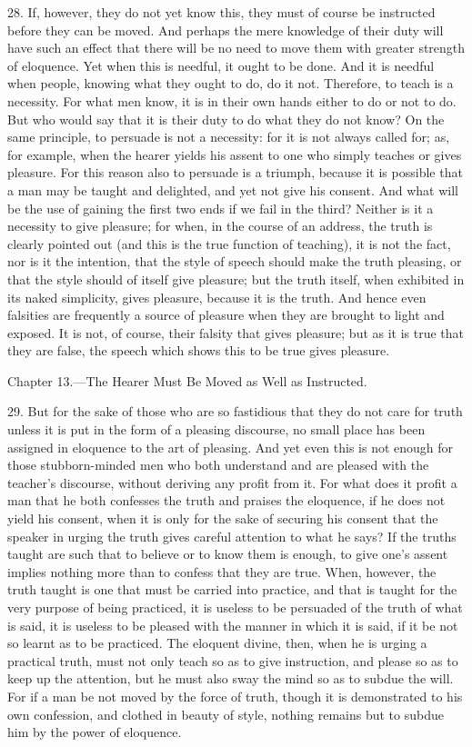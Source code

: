 28. If, however, they do not yet know this, they must of course be instructed before they can be moved. And perhaps the mere knowledge of their duty will have such an effect that there will be no need to move them with greater strength of eloquence. Yet when this is needful, it ought to be done. And it is needful when people, knowing what they ought to do, do it not. Therefore, to teach is a necessity. For what men know, it is in their own hands either to do or not to do. But who would say that it is their duty to do what they do not know? On the same principle, to persuade is not a necessity: for it is not always called for; as, for example, when the hearer yields his assent to one who simply teaches or gives pleasure. For this reason also to persuade is a triumph, because it is possible that a man may be taught and delighted, and yet not give his consent. And what will be the use of gaining the first two ends if we fail in the third? Neither is it a necessity to give pleasure; for when, in the course of an address, the truth is clearly pointed out (and this is the true function of teaching), it is not the fact, nor is it the intention, that the style of speech should make the truth pleasing, or that the style should of itself give pleasure; but the truth itself, when exhibited in its naked simplicity, gives pleasure, because it is the truth. And hence even falsities are frequently a source of pleasure when they are brought to light and exposed. It is not, of course, their falsity that gives pleasure; but as it is true that they are false, the speech which shows this to be true gives pleasure.


Chapter 13.—The Hearer Must Be Moved as Well as Instructed.

29. But for the sake of those who are so fastidious that they do not care for truth unless it is put in the form of a pleasing discourse, no small place has been assigned in  eloquence to the art of pleasing. And yet even this is not enough for those stubborn-minded men who both understand and are pleased with the teacher’s discourse, without deriving any profit from it. For what does it profit a man that he both confesses the truth and praises the eloquence, if he does not yield his consent, when it is only for the sake of securing his consent that the speaker in urging the truth gives careful attention to what he says? If the truths taught are such that to believe or to know them is enough, to give one’s assent implies nothing more than to confess that they are true. When, however, the truth taught is one that must be carried into practice, and that is taught for the very purpose of being practiced, it is useless to be persuaded of the truth of what is said, it is useless to be pleased with the manner in which it is said, if it be not so learnt as to be practiced. The eloquent divine, then, when he is urging a practical truth, must not only teach so as to give instruction, and please so as to keep up the attention, but he must also sway the mind so as to subdue the will. For if a man be not moved by the force of truth, though it is demonstrated to his own confession, and clothed in beauty of style, nothing remains but to subdue him by the power of eloquence.


